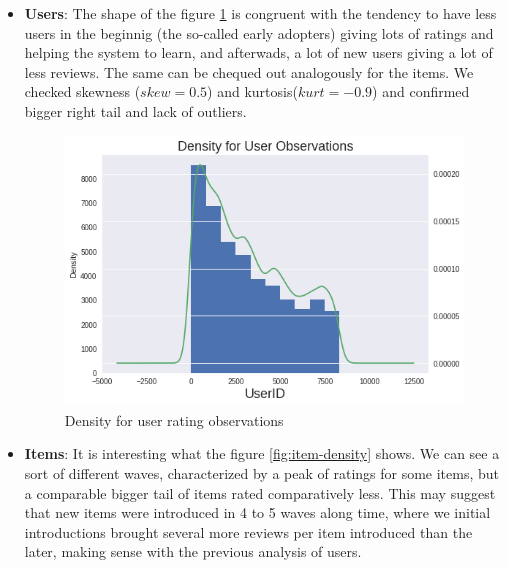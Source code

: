 \documentclass[letterpaper, 10 pt, conference]{ieeeconf}  %
\begin{document}
\begin{enumerate}
\begin{itemize}
        \item \textbf{Users}: The shape of the figure \ref{fig:user-density} is congruent with the tendency to have less users in the beginnig (the so-called early adopters) giving lots of ratings and helping the system to learn, and afterwads, a lot of new users giving a lot of less reviews. The same can be chequed out analogously for the items. We checked skewness ($skew=0.5$) and kurtosis($kurt=-0.9$) and confirmed bigger right tail and lack of outliers.
        
        \begin{figure}[h]
            
            \includegraphics[scale=0.4]{userID_hist-kde.png}
            \centering
            \caption{Density for user rating observations}
            \label{fig:user-density}
            
        \end{figure}
            
        \item \textbf{Items}:  It is interesting what the figure \ref{fig:item-density} shows. We can see a sort of different waves, characterized by a peak of ratings for some items, but a comparable bigger tail of items rated comparatively less. This may suggest that new items were introduced in 4 to 5 waves along time, where we initial introductions brought several more reviews per item introduced than the later, making sense with the previous analysis of users.
        
        \begin{figure}[h]
            

\end{figure}
\end{itemize}
\end{enumerate}
\end{document}

